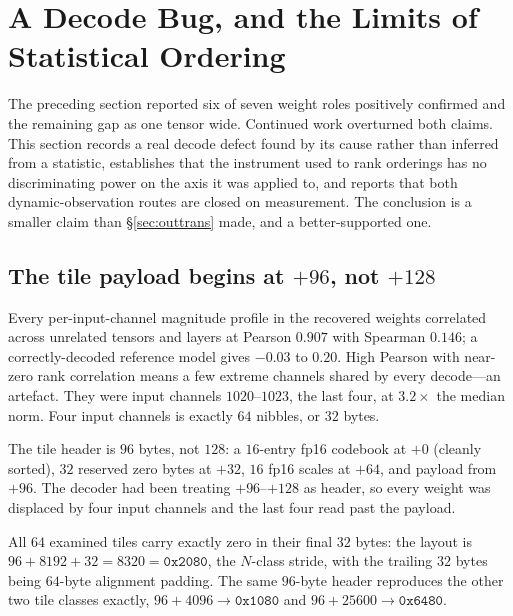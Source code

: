 \section{A Decode Bug, and the Limits of Statistical Ordering}\label{sec:latecycle}

The preceding section reported six of seven weight roles positively confirmed and the remaining gap
as one tensor wide. Continued work overturned both claims. This section records a real decode defect
found by its cause rather than inferred from a statistic, establishes that the instrument used to
rank orderings has no discriminating power on the axis it was applied to, and reports that both
dynamic-observation routes are closed on measurement. The conclusion is a smaller claim than
\S\ref{sec:outtrans} made, and a better-supported one.

\subsection{The tile payload begins at \texorpdfstring{$+96$}{+96}, not \texorpdfstring{$+128$}{+128}}

Every per-input-channel magnitude profile in the recovered weights correlated across unrelated
tensors and layers at Pearson $0.907$ with Spearman $0.146$; a correctly-decoded reference model
gives $-0.03$ to $0.20$. High Pearson with near-zero rank correlation means a few extreme channels
shared by every decode---an artefact. They were input channels $1020$--$1023$, the last four, at
$3.2\times$ the median norm. Four input channels is exactly $64$ nibbles, or $32$ bytes.

The tile header is $96$ bytes, not $128$: a $16$-entry \textrm{fp16} codebook at $+0$ (cleanly
sorted), $32$ reserved zero bytes at $+32$, $16$ \textrm{fp16} scales at $+64$, and payload from
$+96$. The decoder had been treating $+96$--$+128$ as header, so every weight was displaced by four
input channels and the last four read past the payload.

\begin{finding}\label{find:p96}
All $64$ examined tiles carry exactly zero in their final $32$ bytes: the layout is
$96 + 8192 + 32 = 8320 = \mathtt{0x2080}$, the $N$-class stride, with the trailing $32$ bytes being
$64$-byte alignment padding. The same $96$-byte header reproduces the other two tile classes exactly,
$96+4096\rightarrow\mathtt{0x1080}$ and $96+25600\rightarrow\mathtt{0x6480}$.
\end{finding}

